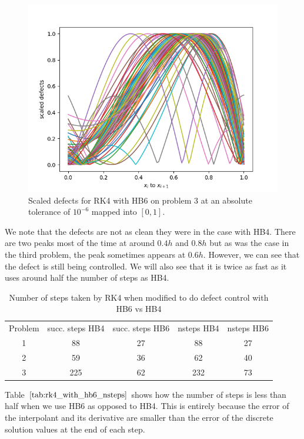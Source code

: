 \begin{figure}[H]
\centering
\includegraphics[width=0.7\linewidth]{./figures/rk4_with_hb6_p3_scaled_defects}
\caption{Scaled defects for RK4 with HB6 on problem 3 at an absolute tolerance of $10^{-6}$ mapped into $[0, 1]$.}
\label{fig:rk4_with_hb6_p3_scaled_defects}
\end{figure}

We note that the defects are not as clean they were in the case with HB4. There are two peaks most of the time at around $0.4h$ and $0.8h$ but as was the case in the third problem, the peak sometimes appears at $0.6h$. However, we can see that the defect is still being controlled. We will also see that it is twice as fast as it uses around half the number of steps as HB4.

\begin{table}[h]
\caption {Number of steps taken by RK4 when modified to do defect control with HB6 vs HB4} \label{tab:rk4_with_hb6_nsteps}
\begin{center}
\begin{tabular}{ c c c c c } 
Problem & succ. steps HB4 & succ. steps HB6 & nsteps HB4  & nsteps HB6 \\ 
1       & 88                 &        27          & 88         & 27 \\ 
2       & 59                 &        36          & 62         & 40 \\
3       & 225                &        62          & 232        & 73 \\
\end{tabular}
\end{center}
\end{table}

Table $\ref{tab:rk4_with_hb6_nsteps}$ shows how the number of steps is less than half when we use HB6 as opposed to HB4. This is entirely because the error of the interpolant and its derivative are smaller than the error of the discrete solution values at the end of each step.


